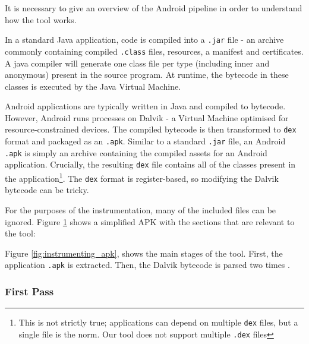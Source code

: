 It is necessary to give an overview of the Android pipeline in order to understand how the tool works.

In a standard Java application, code is compiled into a {\tt .jar} file - an archive commonly containing compiled {\tt .class} files, resources, a manifest and certificates. A java compiler will generate one class file per type (including inner and anonymous) present in the source program. At runtime, the bytecode in these classes is executed by the Java Virtual Machine.

Android applications are typically written in Java and compiled to bytecode. However, Android runs processes on Dalvik - a Virtual Machine optimised for resource-constrained devices. The compiled bytecode is then transformed to {\tt dex} format and packaged as an {\tt .apk}. Similar to a standard {\tt .jar} file, an Android {\tt .apk} is simply an archive containing the compiled assets for an Android application. Crucially, the resulting {\tt dex} file contains all of the classes present in the application\footnote{This is not strictly true; applications can depend on multiple {\tt dex} files, but a single file is the norm. Our tool does not support multiple {\tt .dex} files}. The {\tt dex} format is register-based, so modifying the Dalvik bytecode can be tricky.


For the purposes of the instrumentation, many of the included files can be ignored. Figure \ref{fig:android_apk} shows a simplified APK with the sections that are relevant to the tool:

\begin{figure}[h]
\caption{}
\label{fig:android_apk}
\end{figure}

Figure \ref{fig:instrumenting_apk}, shows the main stages of the tool. First, the application {\tt .apk} is extracted. Then, the Dalvik bytecode is parsed two times .

\subsubsection{First Pass}

